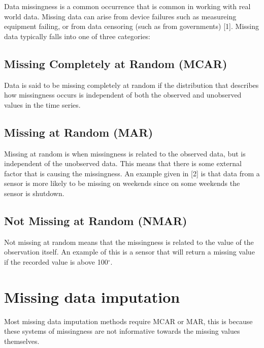 \documentclass[
]{report}
\begin{document}

Data missingness is a common occurrence that is common in working with
real world data. Missing data can arise from device failures such as
measureing equipment failing, or from data censoring (such as from
governments) {[}1{]}. Missing data typically falls into one of three
categories:

\subsection{Missing Completely at Random
(MCAR)}\label{missing-completely-at-random-mcar}

Data is said to be missing completely at random if the distribution that
describes how missingness occurs is independent of both the observed and
unobserved values in the time series.

\subsection{Missing at Random (MAR)}\label{missing-at-random-mar}

Missing at random is when missingness is related to the observed data,
but is independent of the unobserved data. This means that there is some
external factor that is causing the missingness. An example given in
{[}2{]} is that data from a sensor is more likely to be missing on
weekends since on some weekends the sensor is shutdown.

\subsection{Not Missing at Random
(NMAR)}\label{not-missing-at-random-nmar}

Not missing at random means that the missingness is related to the value
of the observation itself. An example of this is a sensor that will
return a missing value if the recorded value is above 100\(^\circ\).


\section{Missing data imputation}\label{missing-data-imputation}

Most missing data imputation methods require MCAR or MAR, this is
because these systems of missingness are not informative towards the
missing values themselves. 
\end{document}
